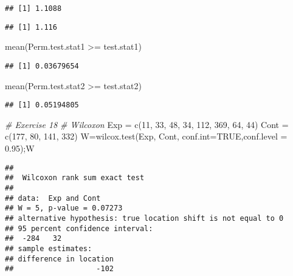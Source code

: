 \documentclass[
]{article}
\newenvironment{Shaded}{\begin{snugshade}}{\end{snugshade}}
\newcommand{\AttributeTok}[1]{\textcolor[rgb]{0.77,0.63,0.00}{#1}}
\newcommand{\CommentTok}[1]{\textcolor[rgb]{0.56,0.35,0.01}{\textit{#1}}}
\newcommand{\ConstantTok}[1]{\textcolor[rgb]{0.00,0.00,0.00}{#1}}
\newcommand{\DecValTok}[1]{\textcolor[rgb]{0.00,0.00,0.81}{#1}}
\newcommand{\FloatTok}[1]{\textcolor[rgb]{0.00,0.00,0.81}{#1}}
\newcommand{\FunctionTok}[1]{\textcolor[rgb]{0.00,0.00,0.00}{#1}}
\newcommand{\NormalTok}[1]{#1}
\newcommand{\OtherTok}[1]{\textcolor[rgb]{0.56,0.35,0.01}{#1}}
\newcommand{\SpecialCharTok}[1]{\textcolor[rgb]{0.00,0.00,0.00}{#1}}
\begin{document}
\begin{verbatim}
## [1] 1.1088
\end{verbatim}

\begin{verbatim}
## [1] 1.116
\end{verbatim}

\begin{Shaded}
\begin{Highlighting}[]
\FunctionTok{mean}\NormalTok{(Perm.test.stat1 }\SpecialCharTok{\textgreater{}=}\NormalTok{ test.stat1)}
\end{Highlighting}
\end{Shaded}

\begin{verbatim}
## [1] 0.03679654
\end{verbatim}

\begin{Shaded}
\begin{Highlighting}[]
\FunctionTok{mean}\NormalTok{(Perm.test.stat2 }\SpecialCharTok{\textgreater{}=}\NormalTok{ test.stat2)}
\end{Highlighting}
\end{Shaded}

\begin{verbatim}
## [1] 0.05194805
\end{verbatim}

\begin{Shaded}
\begin{Highlighting}[]
\CommentTok{\# Exercise 18}
\CommentTok{\# Wilcoxon}
\NormalTok{Exp }\OtherTok{=} \FunctionTok{c}\NormalTok{(}\DecValTok{11}\NormalTok{, }\DecValTok{33}\NormalTok{, }\DecValTok{48}\NormalTok{, }\DecValTok{34}\NormalTok{, }\DecValTok{112}\NormalTok{, }\DecValTok{369}\NormalTok{, }\DecValTok{64}\NormalTok{, }\DecValTok{44}\NormalTok{)}
\NormalTok{Cont }\OtherTok{=} \FunctionTok{c}\NormalTok{(}\DecValTok{177}\NormalTok{, }\DecValTok{80}\NormalTok{, }\DecValTok{141}\NormalTok{, }\DecValTok{332}\NormalTok{)}
\NormalTok{W}\OtherTok{=}\FunctionTok{wilcox.test}\NormalTok{(Exp, Cont, }\AttributeTok{conf.int=}\ConstantTok{TRUE}\NormalTok{,}\AttributeTok{conf.level =} \FloatTok{0.95}\NormalTok{);W}
\end{Highlighting}
\end{Shaded}

\begin{verbatim}
## 
##  Wilcoxon rank sum exact test
## 
## data:  Exp and Cont
## W = 5, p-value = 0.07273
## alternative hypothesis: true location shift is not equal to 0
## 95 percent confidence interval:
##  -284   32
## sample estimates:
## difference in location 
##                   -102
\end{verbatim}
\end{document}
